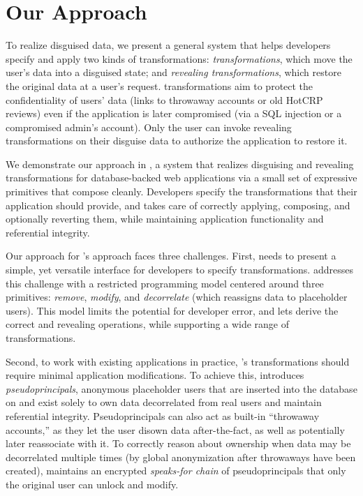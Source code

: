 \section{Our Approach}
%
To realize disguised data, we present a general system that helps developers
specify and apply two kinds of transformations: \emph{\xxing transformations},
which move the user's data into a disguised state; and \emph{revealing
transformations}, which restore the original data at a user’s request.
%
\Xxing transformations aim to protect the confidentiality of users' \xxed data
(\eg links to throwaway accounts or old HotCRP reviews) even if the application
is later compromised (\eg via a SQL injection or a compromised admin's account).
%
Only the user can invoke revealing transformations on their disguise data to
authorize the application to restore it.
%

%
We demonstrate our approach in \sys, a system that realizes disguising and
revealing transformations for database-backed web applications via a small set of
expressive primitives that compose cleanly.
%
Developers specify the transformations that their application should provide,
and \sys takes care of correctly applying, composing, and optionally reverting
them, while maintaining application functionality and referential integrity.
%

Our approach for \sys's approach faces three challenges.
First, \sys needs to present a simple, yet versatile interface for developers to
specify \xxing transformations.
%
\sys addresses this challenge with a restricted programming model centered
around three primitives: \emph{remove}, \emph{modify}, and \emph{decorrelate} (which reassigns data
to placeholder users).
%
This model limits the potential for developer error, and lets \sys derive the
correct \xxing and revealing operations, while supporting a wide range of
transformations.
%

%
Second, to work with existing applications in practice, \sys's \xxing
transformations should require minimal application modifications.
%
To achieve this, \sys introduces \emph{pseudoprincipals}, anonymous placeholder
users that are inserted into the database on \xxing and exist solely to own data
decorrelated from real users and maintain referential integrity.
%
Pseudoprincipals can also act as built-in ``throwaway accounts,'' as they let
the user disown data after-the-fact, as well as potentially later reassociate
with it.
%
To correctly reason about ownership when data may be decorrelated multiple times
(\eg by global anonymization after throwaways have been created), \sys maintains
an encrypted \emph{speaks-for chain} of pseudoprincipals that only the original user
can unlock and modify.
%

